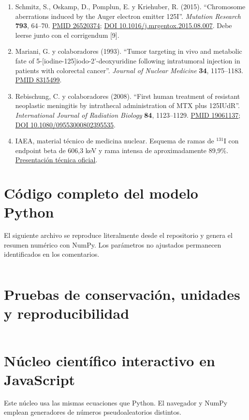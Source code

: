 \documentclass[11pt,a4paper,oneside]{article}
\begin{document}
\begin{enumerate}
\item Schmitz, S., Oskamp, D., Pomplun, E. y Kriehuber, R. (2015).
``Chromosome aberrations induced by the Auger electron emitter 125I''.
\emph{Mutation Research} \textbf{793}, 64--70.
\href{https://pubmed.ncbi.nlm.nih.gov/26520374/}{PMID 26520374};
\href{https://doi.org/10.1016/j.mrgentox.2015.08.007}{DOI 10.1016/j.mrgentox.2015.08.007}.
Debe leerse junto con el corrigendum [9].
\item Mariani, G. y colaboradores (1993). ``Tumor targeting in vivo and metabolic
fate of 5-[iodine-125]iodo-2'-deoxyuridine following intratumoral injection in
patients with colorectal cancer''. \emph{Journal of Nuclear Medicine} \textbf{34},
1175--1183. \href{https://pubmed.ncbi.nlm.nih.gov/8315499/}{PMID 8315499}.
\item Rebischung, C. y colaboradores (2008). ``First human treatment of resistant
neoplastic meningitis by intrathecal administration of MTX plus 125IUdR''.
\emph{International Journal of Radiation Biology} \textbf{84}, 1123--1129.
\href{https://pubmed.ncbi.nlm.nih.gov/19061137/}{PMID 19061137};
\href{https://doi.org/10.1080/09553000802395535}{DOI 10.1080/09553000802395535}.
\item IAEA, material técnico de medicina nuclear. Esquema de ramas de
$^{131}$I con endpoint beta de 606,3 keV y rama intensa de aproximadamente
89,9\%. \href{https://www.iaea.org/sites/default/files/22/06/drls_and_activity_calibrators.pdf}{Presentación técnica oficial}.
\end{enumerate}

\clearpage
\appendix
\section{Código completo del modelo Python}
El siguiente archivo se reproduce literalmente desde el repositorio y genera el
resumen numérico con NumPy. Los parámetros no ajustados permanecen identificados
en los comentarios.
\inputminted{python}{../python/modelo.py}
\clearpage
\section{Pruebas de conservación, unidades y reproducibilidad}
\inputminted{python}{../python/verificar.py}
\clearpage
\section{Núcleo científico interactivo en JavaScript}
Este núcleo usa las mismas ecuaciones que Python. El navegador y NumPy emplean
generadores de números pseudoaleatorios distintos.
\inputminted{javascript}{../science.js}
\clearpage
\end{document}
